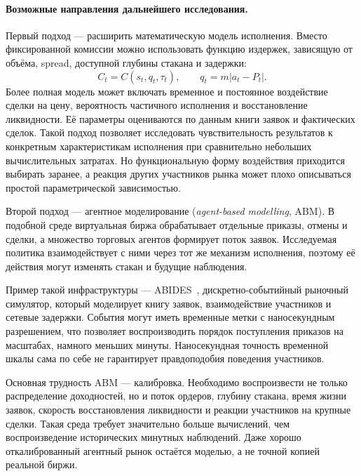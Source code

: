 \documentclass[9pt,a4paper,twocolumn]{extarticle}
\begin{document}
\paragraph{Возможные направления дальнейшего исследования.}

Первый подход --- расширить математическую модель исполнения. Вместо фиксированной комиссии
можно использовать функцию издержек, зависящую от объёма, spread, доступной глубины стакана и
задержки:
\begin{equation}
    C_t
    =
    C(s_t,q_t,\tau_t),
    \qquad
    q_t=m|a_t-P_t|.
    \label{eq:execution_cost_model}
\end{equation}
Более полная модель может включать временное и постоянное воздействие сделки на цену,
вероятность частичного исполнения и восстановление ликвидности. Её параметры оцениваются по
данным книги заявок и фактических сделок. Такой подход позволяет исследовать чувствительность
результатов к конкретным характеристикам исполнения при сравнительно небольших вычислительных
затратах. Но функциональную форму воздействия приходится выбирать заранее, а реакция других
участников рынка может плохо описываться простой параметрической зависимостью.

Второй подход --- агентное моделирование (\emph{agent-based modelling}, ABM). В подобной среде
виртуальная биржа обрабатывает отдельные приказы, отмены и сделки, а множество торговых агентов
формирует поток заявок. Исследуемая политика взаимодействует с ними через тот же механизм
исполнения, поэтому её действия могут изменять стакан и будущие наблюдения.

Пример такой инфраструктуры --- ABIDES~\cite{byrd2020abides}, дискретно-событийный рыночный
симулятор, который моделирует книгу заявок, взаимодействие участников и сетевые задержки.
События могут иметь временные метки с наносекундным разрешением, что позволяет воспроизводить
порядок поступления приказов на масштабах, намного меньших минуты. Наносекундная точность
временной шкалы сама по себе не гарантирует правдоподобия поведения участников.

Основная трудность ABM --- калибровка. Необходимо воспроизвести не только распределение
доходностей, но и поток ордеров, глубину стакана, время жизни заявок, скорость восстановления
ликвидности и реакции участников на крупные сделки. Такая среда требует значительно больше
вычислений, чем воспроизведение исторических минутных наблюдений. Даже хорошо откалиброванный
агентный рынок остаётся моделью, а не точной копией реальной биржи.
\end{document}
